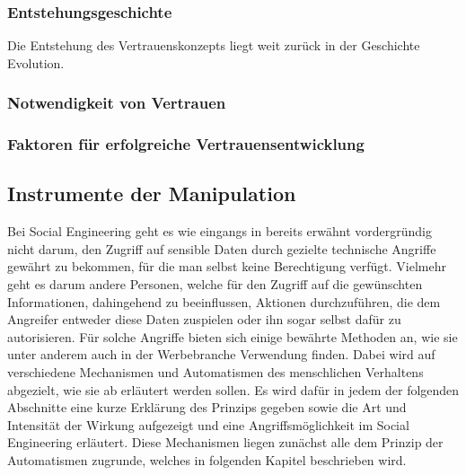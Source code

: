 \subsubsection{Entstehungsgeschichte}
Die Entstehung des Vertrauenskonzepts liegt weit zurück in der Geschichte Evolution.

\cite{liars-and-outliers}

\subsubsection{Notwendigkeit von Vertrauen}\label{sec:notwendigkeit-von-vertauen}

\subsubsection{Faktoren für erfolgreiche Vertrauensentwicklung}
\cite{liars-and-outliers}

\subsection{Instrumente der Manipulation}\label{sec:instrumente_der_manipulation}
Bei Social Engineering geht es wie eingangs in  bereits erwähnt vordergründig
nicht darum, den Zugriff auf sensible Daten durch gezielte technische Angriffe gewährt zu bekommen,
für die man selbst keine Berechtigung verfügt.
Vielmehr geht es darum andere Personen, welche für den Zugriff auf die gewünschten Informationen, dahingehend
zu beeinflussen, Aktionen durchzuführen, die dem Angreifer entweder diese Daten zuspielen oder ihn sogar selbst
dafür zu autorisieren.
Für solche Angriffe bieten sich einige bewährte Methoden an, wie sie unter anderem auch in der Werbebranche
Verwendung finden.
Dabei wird auf verschiedene Mechanismen und Automatismen des menschlichen Verhaltens abgezielt, wie sie ab  erläutert werden sollen.
Es wird dafür in jedem der folgenden Abschnitte eine kurze Erklärung des Prinzips gegeben sowie die Art und
Intensität der Wirkung aufgezeigt und eine Angriffsmöglichkeit im Social Engineering erläutert.
Diese Mechanismen liegen zunächst alle dem Prinzip der Automatismen zugrunde, welches in folgenden Kapitel beschrieben wird.

